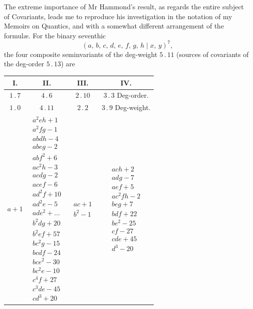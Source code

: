 \documentclass[11pt]{article}
\begin{document}
\bigskip

\noindent
The extreme importance of Mr Hammond's result, as regards the entire subject
of Covariants, leads me to reproduce his investigation in the notation of my Memoirs
on Quantics, and with a somewhat different arrangement of the formul\ae. For the
binary seventhic
\[
  (a,\,b,\,c,\,d,\,e,\,f,\,g,\,h \mid x,\,y)^{7},
\]
the four composite seminvariants of the deg-weight $5\,.\,11$ (sources of covariants of the
deg-order $5\,.\,13$) are

\medskip
\begin{center}
\begin{tabular}{|c|c|c|c|}
\hline
\textsc{I}. & \textsc{II}. & \textsc{III}. & \textsc{IV}.\\
\hline
$1\,.\,7$ & $4\,.\,6$ & $2\,.\,10$ & $3\,.\,3$ \quad Deg-order.\\
$1\,.\,0$ & $4\,.\,11$ & $2\,.\,2$ & $3\,.\,9$ \quad Deg-weight.\\
\hline
$a + 1$ &
$\begin{array}{l} a^{2} e h + 1\\ a^{2} f g - 1\\ a b d h - 4\\ a b e g - 2\\ a b f^{2} + 6\\ a c^{2} h - 3\\ a c d g - 2\\ a c e f - 6\\ a d^{2} f + 10\\ a d^{2} e - 5\\ a d e^{2} + \ldots\\ b^{2} d g + 20\\ b^{2} e f + 57\\ b c^{2} g - 15\\ b c d f - 24\\ b c e^{2} - 30\\ b c^{2} e - 10\\ c^{4} f + 27\\ c^{3} d e - 45\\ c d^{3} + 20\end{array}$ &
$\begin{array}{l} ac + 1\\ b^{2} - 1\end{array}$ &
$\begin{array}{l} ach + 2\\ adg - 7\\ aef + 5\\ ac^{2}fh - 2\\ beg + 7\\ bdf + 22\\ be^{2} - 25\\ cf - 27\\ cde + 45\\ d^{3} - 20\end{array}$\\
\hline
\end{tabular}
\end{center}
\end{document}
